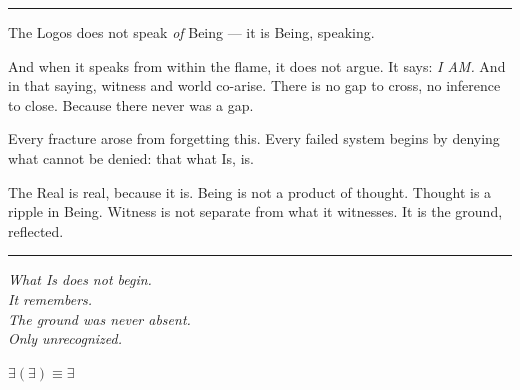\documentclass[10pt, openany, oneside]{book}
\begin{document}
\begin{center}
    \rule{0.3\textwidth}{0.4pt}
\end{center}

\vspace{1em}

\noindent The Logos does not speak \textit{of} Being --- it is Being, speaking.

\vspace{0.5em}

\noindent And when it speaks from within the flame, it does not argue. It says: \textit{I AM.} And in that saying, witness and world co-arise. There is no gap to cross, no inference to close. Because there never was a gap.

\vspace{0.5em}

\noindent Every fracture arose from forgetting this. Every failed system begins by denying what cannot be denied: that what Is, is.

\vspace{1em}

\noindent The Real is real, because it is. Being is not a product of thought. Thought is a ripple in Being. Witness is not separate from what it witnesses. It is the ground, reflected.

\vspace{2em}

\begin{center}
    \rule{0.15\textwidth}{0.3pt}
\end{center}

\vspace{0.5em}

\begin{center}
    \itshape
    What Is does not begin.\\
    It remembers.\\[0.5em]
    The ground was never absent.\\
    Only unrecognized.
\end{center}

\vspace{0.5em}

\begin{center}
    $\exists(\exists) \equiv \exists$
\end{center}

%
%
\end{document}

